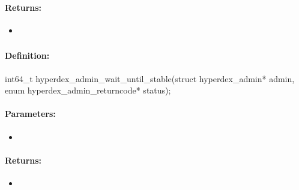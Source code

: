 \paragraph{Returns:}
\begin{itemize}[noitemsep]
\item {}\\

\end{itemize}

\pagebreak
\subsubsection{}
\label{api:c:wait_until_stable}


\paragraph{Definition:}
\begin{ccode}
int64_t hyperdex_admin_wait_until_stable(struct hyperdex_admin* admin,
        enum hyperdex_admin_returncode* status);
\end{ccode}

\paragraph{Parameters:}
\begin{itemize}[noitemsep]
\item {}\\

\end{itemize}

\paragraph{Returns:}
\begin{itemize}[noitemsep]
\item {}\\

\end{itemize}

\pagebreak
\subsubsection{}
\label{api:c:fault_tolerance}


